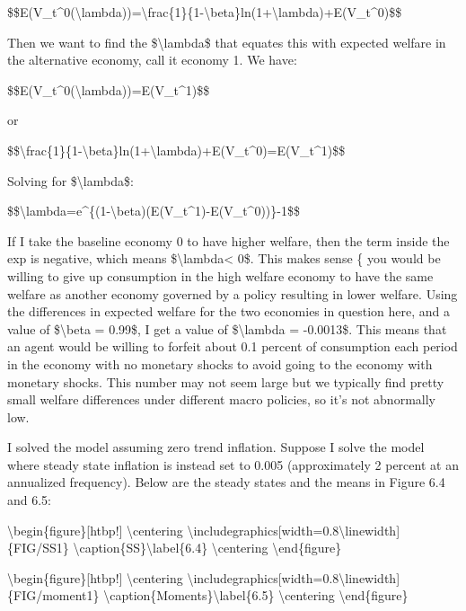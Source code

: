 \documentclass[10pt,math=newtx,citestyle=gb7714-2015,bibstyle=gb7714-2015]{elegantbook}
\begin{document}
	\$\$E(V\_t\^{}0(\textbackslash{}lambda))=\textbackslash{}frac\{1\}\{1-\textbackslash{}beta\}ln(1+\textbackslash{}lambda)+E(V\_t\^{}0)\$\$
	
	Then we want to find the \$\textbackslash{}lambda\$  that equates this with expected welfare in the alternative economy, call it economy 1. We have:
	
	\$\$E(V\_t\^{}0(\textbackslash{}lambda))=E(V\_t\^{}1)\$\$
	
	or
	
	\$\$\textbackslash{}frac\{1\}\{1-\textbackslash{}beta\}ln(1+\textbackslash{}lambda)+E(V\_t\^{}0)=E(V\_t\^{}1)\$\$
	
	Solving for \$\textbackslash{}lambda\$:
	
	\$\$\textbackslash{}lambda=e\^{}\{(1-\textbackslash{}beta)(E(V\_t\^{}1)-E(V\_t\^{}0))\}-1\$\$
	
	If I take the baseline economy 0 to have higher welfare, then the term inside the exp is negative, which means \$\textbackslash{}lambda< 0\$. This makes sense \{ you would be willing to give up consumption in the high welfare economy to have the same welfare as another economy governed by a policy resulting in lower welfare. Using the differences in expected welfare for the two economies in question here, and a value of \$\textbackslash{}beta = 0.99\$, I get a value of \$\textbackslash{}lambda = -0.0013\$. This means that an agent would be willing
	to forfeit about 0.1 percent of consumption each period in the economy with no monetary shocks to avoid going to the economy with monetary shocks. This number may not seem large but we
	typically find pretty small welfare differences under different macro policies, so it's not abnormally low.
	
	I solved the model assuming zero trend inflation. Suppose I solve the model where steady state inflation is instead set to 0.005 (approximately 2 percent at an annualized frequency). Below are the steady states and the means in Figure 6.4 and 6.5:
	
	\textbackslash{}begin\{figure\}[htbp!]
	\textbackslash{}centering
	\textbackslash{}includegraphics[width=0.8\textbackslash{}linewidth]\{FIG/SS1\}
	\textbackslash{}caption\{SS\}\textbackslash{}label\{6.4\}
	\textbackslash{}centering
	\textbackslash{}end\{figure\}
	
	\textbackslash{}begin\{figure\}[htbp!]
	\textbackslash{}centering
	\textbackslash{}includegraphics[width=0.8\textbackslash{}linewidth]\{FIG/moment1\}
	\textbackslash{}caption\{Moments\}\textbackslash{}label\{6.5\}
	\textbackslash{}centering
	\textbackslash{}end\{figure\}
	
\end{document}
